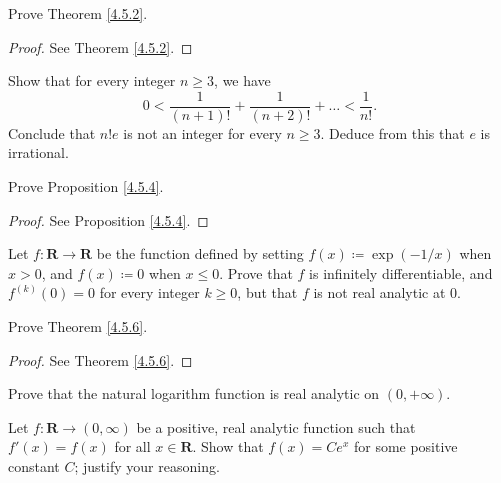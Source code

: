 \exercisesection

\begin{exercise}\label{ex 4.5.1}
    Prove Theorem \ref{4.5.2}.
\end{exercise}

\begin{proof}
    See Theorem \ref{4.5.2}.
\end{proof}

\begin{exercise}\label{ex 4.5.2}
    Show that for every integer \(n \geq 3\), we have
    \[
        0 < \frac{1}{(n + 1)!} + \frac{1}{(n + 2)!} + \dots < \frac{1}{n!}.
    \]
    Conclude that \(n! e\) is not an integer for every \(n \geq 3\).
    Deduce from this that \(e\) is irrational.
\end{exercise}

\begin{exercise}\label{ex 4.5.3}
    Prove Proposition \ref{4.5.4}.
\end{exercise}

\begin{proof}
    See Proposition \ref{4.5.4}.
\end{proof}

\begin{exercise}\label{ex 4.5.4}
    Let \(f : \mathbf{R} \to \mathbf{R}\) be the function defined by setting \(f(x) \coloneqq \exp(-1 / x)\) when \(x > 0\), and \(f(x) \coloneqq 0\) when \(x \leq 0\).
    Prove that \(f\) is infinitely differentiable, and \(f^{(k)}(0) = 0\) for every integer \(k \geq 0\), but that \(f\) is not real analytic at \(0\).
\end{exercise}

\begin{exercise}\label{ex 4.5.5}
    Prove Theorem \ref{4.5.6}.
\end{exercise}

\begin{proof}
    See Theorem \ref{4.5.6}.
\end{proof}

\begin{exercise}\label{ex 4.5.6}
    Prove that the natural logarithm function is real analytic on \((0, +\infty)\).
\end{exercise}

\begin{exercise}\label{ex 4.5.7}
    Let \(f : \mathbf{R} \to (0, \infty)\) be a positive, real analytic function such that \(f'(x) = f(x)\) for all \(x \in \mathbf{R}\).
    Show that \(f(x) = C e^x\) for some positive constant \(C\);
    justify your reasoning.
\end{exercise}

